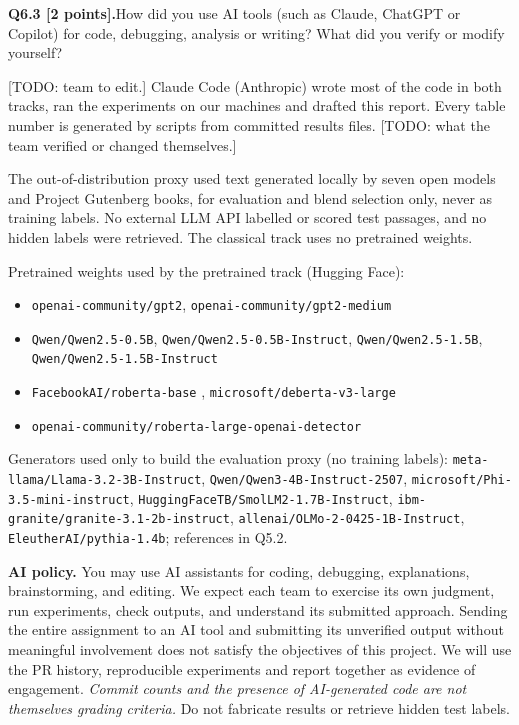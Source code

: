\documentclass[11pt,letterpaper]{article}
\newcommand{\question}[2]{\needspace{4\baselineskip}\par\addvspace{0.45em}\noindent\textbf{#1}\quad #2\par\nobreak\vspace{0.1em}}
\begin{document}
\question{Q6.3 [2 points].}{How did you use AI tools (such as Claude, ChatGPT or Copilot) for code, debugging, analysis or writing? What did you verify or modify yourself?}
[TODO: team to edit.] Claude Code (Anthropic) wrote most of the code in both tracks, ran the experiments on our machines and drafted this report. Every table number is generated by scripts from committed results files. [TODO: what the team verified or changed themselves.]

The out-of-distribution proxy used text generated locally by seven open models and Project Gutenberg books, for evaluation and blend selection only, never as training labels. No external LLM API labelled or scored test passages, and no hidden labels were retrieved. The classical track uses no pretrained weights.

Pretrained weights used by the pretrained track (Hugging Face):
{\small\begin{itemize}
\item \texttt{openai-community/gpt2}, \texttt{openai-community/gpt2-medium} \cite{gpt2}
\item \texttt{Qwen/Qwen2.5-0.5B}, \texttt{Qwen/Qwen2.5-0.5B-Instruct}, \texttt{Qwen/Qwen2.5-1.5B}, \texttt{Qwen/Qwen2.5-1.5B-Instruct} \cite{qwen25}
\item \texttt{FacebookAI/roberta-base} \cite{roberta}, \texttt{microsoft/deberta-v3-large} \cite{debertav3}
\item \texttt{openai-community/roberta-large-openai-detector} \cite{solaiman2019}
\end{itemize}}
{\small\raggedright Generators used only to build the evaluation proxy (no training labels): \texttt{meta-llama/Llama-3.2-3B-Instruct}, \texttt{Qwen/Qwen3-4B-Instruct-2507}, \texttt{microsoft/Phi-3.5-mini-instruct}, \texttt{HuggingFaceTB/SmolLM2-1.7B-Instruct}, \texttt{ibm-granite/granite-3.1-2b-instruct}, \texttt{allenai/OLMo-2-0425-1B-Instruct}, \texttt{EleutherAI/pythia-1.4b}; references in Q5.2.\par}

\textbf{AI policy.} You may use AI assistants for coding, debugging, explanations, brainstorming, and editing. We expect each team to exercise its own judgment, run experiments, check outputs, and understand its submitted approach. Sending the entire assignment to an AI tool and submitting its unverified output without meaningful involvement does not satisfy the objectives of this project. We will use the PR history, reproducible experiments and report together as evidence of engagement. \emph{Commit counts and the presence of AI-generated code are not themselves grading criteria.} Do not fabricate results or retrieve hidden test labels.
\end{document}
